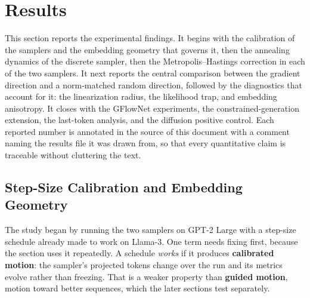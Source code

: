 \section{Results}
\label{ch:results}

This section reports the experimental findings. It begins with the calibration of the samplers and the embedding geometry that governs it, then the annealing dynamics of the discrete sampler, then the Metropolis--Hastings correction in each of the two samplers. It next reports the central comparison between the gradient direction and a norm-matched random direction, followed by the diagnostics that account for it: the linearization radius, the likelihood trap, and embedding anisotropy. It closes with the GFlowNet experiments, the constrained-generation extension, the last-token analysis, and the diffusion positive control. Each reported number is annotated in the source of this document with a comment naming the results file it was drawn from, so that every quantitative claim is traceable without cluttering the text.

\subsection{Step-Size Calibration and Embedding Geometry}
\label{sec:results-stepsize}

The study began by running the two samplers on GPT-2 Large with a step-size schedule already made to work on Llama-3. One term needs fixing first, because the section uses it repeatedly. A schedule \emph{works} if it produces \textbf{calibrated motion}: the sampler's projected tokens change over the run and its metrics evolve rather than freezing. That is a weaker property than \textbf{guided motion}, motion toward better sequences, which the later sections test separately.

